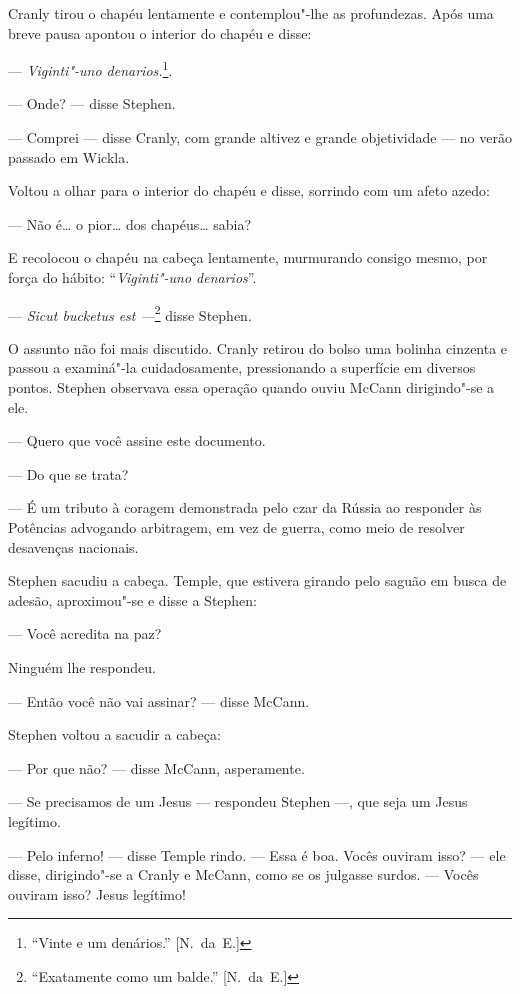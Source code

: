 Cranly tirou o chapéu lentamente e contemplou"-lhe as profundezas.  Após uma
breve pausa apontou o interior do chapéu e disse:

--- \textit{Viginti"-uno denarios.}\footnote{ ``Vinte e um denários.'' [N.~da~E.]}.

--- Onde? --- disse Stephen.

--- Comprei --- disse Cranly, com grande altivez e grande objetividade --- no
verão passado em Wickla.

Voltou a olhar para o interior do chapéu e disse, \label{sorrindo"-com}%
sorrindo com um afeto azedo:

--- Não é\ldots{} o pior\ldots{} dos chapéus\ldots{} sabia?

E recolocou o chapéu na cabeça lentamente, murmurando consigo mesmo, por força
do hábito: “\textit{Viginti"-uno denarios}”.

--- \textit{Sicut bucketus est ---}\footnote{ ``Exatamente como um balde.'' [N.~da~E.]} disse Stephen.

O assunto não foi mais discutido.  Cranly retirou do bolso uma bolinha cinzenta
e passou a examiná"-la cuidadosamente, \mbox{pressionando} a superfície em diversos
pontos.  Stephen observava essa operação quando ouviu McCann dirigindo"-se a
ele.

--- Quero que você assine este documento.

--- Do que se trata?

--- É um tributo à coragem demonstrada pelo czar da Rússia ao responder às
Potências advogando arbitragem, em vez de guerra, como meio de resolver
desavenças nacionais.

Stephen sacudiu a cabeça.  Temple, que estivera girando pelo saguão em busca de
adesão, aproximou"-se e disse a Stephen:

--- Você acredita na paz?

Ninguém lhe respondeu.

--- Então você não vai assinar? --- disse McCann.

Stephen voltou a sacudir a cabeça:

--- Por que não? --- disse McCann, asperamente.

--- Se precisamos de um Jesus --- respondeu Stephen ---, que seja um Jesus
legítimo.

--- Pelo inferno! --- disse Temple rindo.  --- Essa é boa.  Vocês ouviram isso?
--- ele disse, dirigindo"-se a Cranly e McCann, como se os julgasse surdos.  ---
Vocês ouviram isso?  Jesus legítimo!

